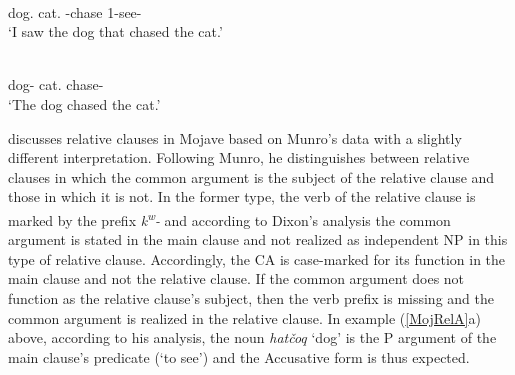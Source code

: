 \enlargethispage{2\baselineskip}
\begin{exe}\ex\label{MojRelA}
\begin{xlist}
\ex\gll  {\rm[}  \textipa{k\super{w}-taver}{\rm]} \\
dog.\acc{} cat.\acc{} \relativ{}-chase 1-see-\tns{}\\
\glt `I saw the dog that chased the cat.'

\ex\gll {}  \\
dog-\nom{} cat.\acc{} chase-\tns{}\\
\glt `The dog chased the cat.'
\end{xlist}
\end{exe}

\citet[333--334]{Dixon:2010-2} discusses relative clauses in Mojave based on Munro's data with a slightly different interpretation. 
Following Munro, he distinguishes between relative clauses in which the common argument is the subject of the relative clause and those in which it is not. 
In the former type, the verb of the relative clause is marked by the prefix \emph{k\textsuperscript{w}-} and according to Dixon's analysis the common argument is stated in the main clause and not realized as independent NP in this type of  relative clause. 
Accordingly, the CA is case-marked for its function in the main clause and not the relative clause. 
If the common argument does not function as the relative clause's subject, then the verb prefix is missing and the common argument is realized in the relative clause. 
In example (\ref{MojRelA}a) above, according to his analysis, the noun \emph{hat\v coq} `dog' is the P argument of  the main clause's predicate (`to see') and the Accusative form is thus expected.  

